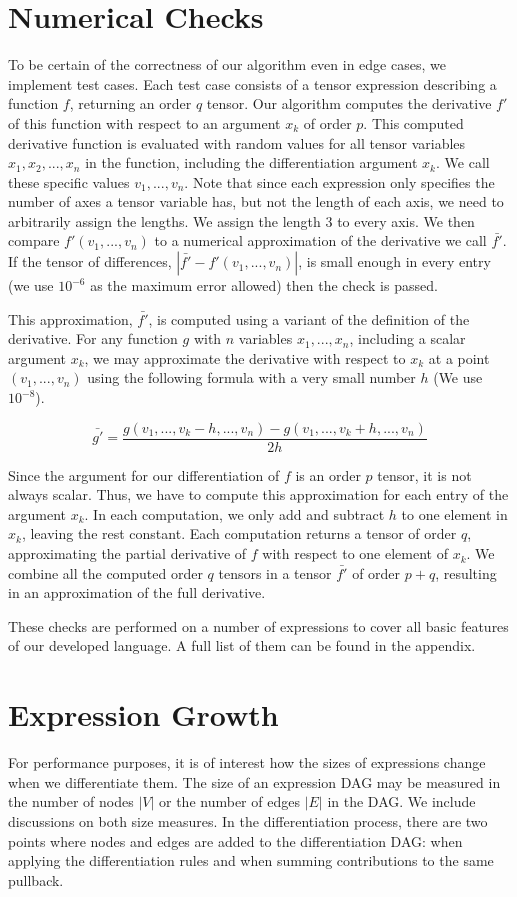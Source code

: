 \documentclass[12pt, a4paper]{report}
\begin{document}
\section{Numerical Checks}
To be certain of the correctness of our algorithm even in edge cases, we implement test cases.
Each test case consists of a tensor expression describing a function $f$, returning an order $q$ tensor. 
Our algorithm computes the derivative $f'$ of this function with respect to an argument $x_k$ of order $p$.
This computed derivative function is evaluated with random values for all tensor variables $x_1, x_2, ..., x_n$ in the function, including the differentiation argument $x_k$.
We call these specific values $v_1, ..., v_n$.
Note that since each expression only specifies the number of axes a tensor variable has, but not the length of each axis, we need to arbitrarily assign the lengths.
We assign the length $3$ to every axis.
We then compare $f'(v_1,..., v_n)$ to a numerical approximation of the derivative we call $\bar{f'}$.
If the tensor of differences, $|\bar{f'} - f'(v_1,..., v_n)|$, is small enough in every entry (we use $10^{-6}$ as the maximum error allowed) then the check is passed.

This approximation, $\bar{f'}$, is computed using a variant of the definition of the derivative.
For any function $g$ with $n$ variables $x_1, ..., x_n$, including a scalar argument $x_k$, we may approximate the derivative with respect to $x_k$ at a point $(v_1, ..., v_n)$ using the following formula with a very small number $h$ (We use $10^{-8}$).

$$\bar{g'} = \frac{g(v_1,..., v_k-h,..., v_n) - g(v_1,..., v_k+h,..., v_n)}{2h}$$ 

Since the argument for our differentiation of $f$ is an order $p$ tensor, it is not always scalar.
Thus, we have to compute this approximation for each entry of the argument $x_k$.
In each computation, we only add and subtract $h$ to one element in $x_k$, leaving the rest constant.
Each computation returns a tensor of order $q$, approximating the partial derivative of $f$ with respect to one element of $x_k$.
We combine all the computed order $q$ tensors in a tensor $\bar{f'}$ of order $p+q$, resulting in an approximation of the full derivative.

These checks are performed on a number of expressions to cover all basic features of our developed language.
A full list of them can be found in the appendix.

\section{Expression Growth}
For performance purposes, it is of interest how the sizes of expressions change when we differentiate them.
The size of an expression DAG may be measured in the number of nodes $|V|$ or the number of edges $|E|$ in the DAG.
We include discussions on both size measures.
In the differentiation process, there are two points where nodes and edges are added to the differentiation DAG: when applying the differentiation rules and when summing contributions to the same pullback.
\end{document}
